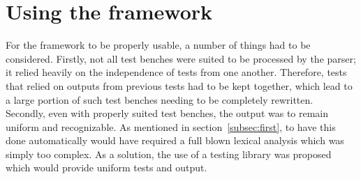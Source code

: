 \documentclass[11pt,british]{article}
\begin{document}
\newpage{}
\section{Using the framework}
\label{sec:using}
For the framework to be properly usable, a number of things had to be considered. Firstly, not all test benches were suited to be processed by the parser; it relied heavily on the independence of tests from one another. Therefore, tests that relied on outputs from previous tests had to be kept together, which lead to a large portion of such test benches needing to be completely rewritten.
\\[\baselineskip]
Secondly, even with properly suited test benches, the output was to remain uniform and recognizable. As mentioned in section~\ref{subsec:first}, to have this done automatically would have required a full blown lexical analysis which was simply too complex. As a solution, the use of a testing library was proposed which would provide uniform tests and output.
\end{document}

